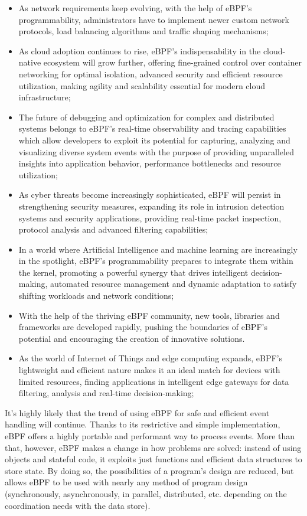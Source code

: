 \begin{itemize}
	\item As network requirements keep evolving, with the help of eBPF's 
		programmability, administrators have to implement newer custom network protocols, load balancing algorithms and traffic shaping mechanisms;
	\item As cloud adoption continues to rise, eBPF's indispensability in the
		cloud-native ecosystem will grow further, offering fine-grained control over container networking for optimal isolation, advanced security and efficient resource utilization, making agility and scalability essential for modern cloud infrastructure;
	\item The future of debugging and optimization for complex and distributed systems
		belongs to eBPF's real-time observability and tracing capabilities which allow developers to exploit its potential for capturing, analyzing and visualizing diverse system events with the purpose of providing unparalleled insights into application behavior, performance bottlenecks and resource utilization;
	\item As cyber threats become increasingly sophisticated, eBPF will persist in
		strengthening security measures, expanding its role in intrusion detection systems and security applications, providing real-time packet inspection, protocol analysis and advanced filtering capabilities;
	\item In a world where Artificial Intelligence and machine learning are
		increasingly in the spotlight, eBPF's programmability prepares to integrate them within the kernel, promoting a powerful synergy that drives intelligent decision-making, automated resource management and dynamic adaptation to satisfy shifting workloads and network conditions;
	\item With the help of the thriving eBPF community, new tools, libraries and
		frameworks are developed rapidly, pushing the boundaries of eBPF's potential and encouraging the creation of innovative solutions.
	\item As the world of Internet of Things and edge computing expands, eBPF's
		lightweight and efficient nature makes it an ideal match for devices with limited resources, finding applications in intelligent edge gateways for data filtering, analysis and real-time decision-making;
\end{itemize}

It’s highly likely that the trend of using eBPF for safe and efficient event handling will continue.
Thanks to its restrictive and simple implementation, eBPF offers a highly portable and performant way to process events. 
More than that, however, eBPF makes a change in how problems are solved: instead of using objects and stateful code, it exploits just functions and efficient data structures to store state. 
By doing so, the possibilities of a program’s design are reduced, but allows eBPF to be used with nearly any method of program design (synchronously, asynchronously, in parallel, distributed, etc. depending on the coordination needs with the data store).

